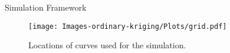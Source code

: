 \documentclass{beamer}
\renewcommand{\H}{\mathcal{H}}
\begin{document}
%
%

%


\begin{frame}[t]{Simulation Framework}
	\begin{figure}[h]
		\begin{center}
			\texttt{[image: Images-ordinary-kriging/Plots/grid.pdf]}
		\end{center}
		\caption{Locations of curves used for the simulation.} \label{fig:grid3}
	\end{figure}
\end{frame}
\end{document}
